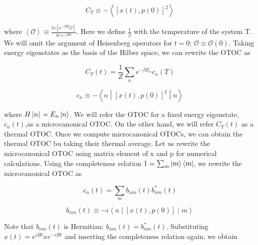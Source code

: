 \documentclass[12pt]{report}
\newcommand*{\1}{\hspace{1pt}}
\begin{document}
        \begin{equation}
            C_{T} \equiv  - \left\langle\left[x(t),p(0)\right]^{2}\right\rangle
        \end{equation}

        where $\left\langle \mathcal{O} \right\rangle \equiv \frac{tr\left[e^{-\beta H }\mathcal{O}\right]}{tr \ e^{-\beta H}}$. Here we define $\frac{1}{\beta}$ with 
        the temperature of the system T. We will omit the argument of Heisenberg operators for $t=0$; $\mathcal{O} \equiv \mathcal{O}(0)$. Taking energy eigenstates as 
        the basis of the Hilber space, we can rewrite the OTOC as 

        \begin{equation}
            C_{T}(t) = \frac{1}{Z} \sum _{n} e^{-\beta E_{n}} c_{n}(T)
        \end{equation}

        \begin{equation}
            c_{n} \equiv -\left\langle n \middle|\left[x(t),p(0)\right]^{2}\middle| n\right\rangle
        \end{equation}

        where $H\ket{n}=E_{n}\ket{n}$. We will refer the OTOC for a fixed energy eigenstate, $c_{n}(t)$,as a microcanonical OTOC. On the other hand, we will refer $C_{T}(t)$ as a
        thermal OTOC. Once we compute microcanonical OTOCs, we can obtain the thermal OTOC bu taking their thermal average. Let us rewrite the microcanonical OTOC using 
        matrix element of x and p for numerical calculations. Using the completeness relation $1 = \sum_{m} \ket{m}\bra{m}$, we rewrite the microcanonical OTOC as 

        \begin{equation}
            c_{n}(t) = \sum_{m} b_{nm}(t) b_{nm} ^{*} (t)  
        \end{equation}
        
        \begin{equation}
            b_{nm}(t) \equiv   -i\left\langle n \middle|\left[x(t),p(0)\right]\middle| m\right\rangle
        \end{equation}

        Note that $b_{nm}(t)$ is Hermitian: $b_{nm}(t) = b_{nm} ^{*} (t)$. Substituting $x(t) = e^{iHt}xe^{-iHt}$ and inserting the completeness relation again, we obtain
\end{document}
